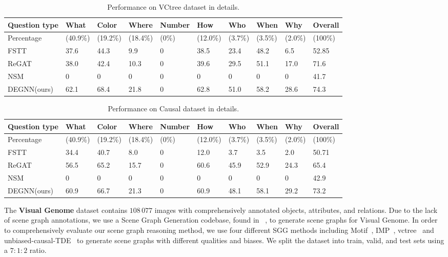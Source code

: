 \begin{table*}
\centering
    \begin{tabular}{l|lllllllll}
    \hline
    \textbf{Question type}&\textbf{What}&\textbf{Color}&\textbf{Where}&\textbf{Number}&\textbf{How}&\textbf{Who}&\textbf{When}&\textbf{Why}&\textbf{Overall}\\
    \hline
     Percentage &(40.9\%) &(19.2\%) &(18.4\%) &(0\%) &(12.0\%) &(3.7\%) &(3.5\%) &(2.0\%) &(100\%)\\
    \hline
     FSTT &37.6 &44.3 &9.9 &0 &38.5 &23.4 &48.2 &6.5 &52.85\\
     ReGAT &38.0 &42.4 &10.3 &0 &39.6 &29.5 &51.1 &17.0 &71.6\\
     NSM &0 &0 &0 &0 &0 &0 &0 &0 &41.7\\
     DEGNN(ours) &62.1 &68.4 &21.8 &0 &62.8 &51.0 &58.2 &28.6 &74.3\\
    \hline
    \end{tabular}
\caption{\label{VCtree-detail}
Performance on VCtree dataset in details.
}
\end{table*}

\begin{table*}
\centering
    \begin{tabular}{l|lllllllll}
    \hline
    \textbf{Question type}&\textbf{What}&\textbf{Color}&\textbf{Where}&\textbf{Number}&\textbf{How}&\textbf{Who}&\textbf{When}&\textbf{Why}&\textbf{Overall}\\
    \hline
     Percentage &(40.9\%) &(19.2\%) &(18.4\%) &(0\%) &(12.0\%) &(3.7\%) &(3.5\%) &(2.0\%) &(100\%)\\
    \hline
     FSTT &34.4 &40.7 &8.0 &0 &12.0 &3.7 &3.5 &2.0 &50.71\\
     ReGAT &56.5 &65.2 &15.7 &0 &60.6 &45.9 &52.9 &24.3 &65.4\\
     NSM &0 &0 &0 &0 &0 &0 &0 &0 &42.9\\
     DEGNN(ours) &60.9 &66.7 &21.3 &0 &60.9 &48.1 &58.1 &29.2 &73.2\\
    \hline
    \end{tabular}
\caption{\label{Causal-detail}
Performance on Causal dataset in details.
}
\end{table*}

The \textbf{Visual Genome} dataset contains $108 \, 077$ images with comprehensively annotated objects, attributes, and relations. Due to the lack of scene graph annotations, we use a Scene Graph Generation codebase, found in ~\cite{tang2020sggcode}, to generate scene graphs for Visual Genome. 
In order to comprehensively evaluate our scene graph reasoning method, we use four different SGG methods including Motif~\cite{DBLP:conf/cvpr/ZellersYTC18}, IMP~\cite{DBLP:conf/cvpr/XuZCF17},  vctree~\cite{DBLP:conf/cvpr/TangZWLL19} and unbiased-causal-TDE~\cite{DBLP:conf/cvpr/TangNHSZ20} to generate scene graphs with different qualities and biases. 
We split the dataset into train, valid, and test sets using a $7:1:2$ ratio.

